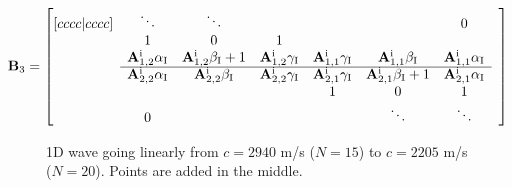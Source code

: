 \documentclass[dvipsnames]{article}
\begin{document}
\begin{equation}
    \mathbf{B}_3 = \begin{bmatrix}[cccc|cccc]
     & \ddots  &\ddots & & & & 0 & \\
       & 1 & 0 & 1 & & & & \\
      & \mathbf{A}_{1, 2}^\text{i}\alpha_\text{I} &\mathbf{A}_{1, 2}^\text{i}\beta_\text{I} + 1 &\mathbf{A}_{1, 2}^\text{i}\gamma_\text{I} & \mathbf{A}_{1, 1}^\text{i}\gamma_\text{I} & \mathbf{A}_{1, 1}^\text{i}\beta_\text{I}& \mathbf{A}_{1, 1}^\text{i}\alpha_\text{I}\\ \cline{2-7}
      &\mathbf{A}_{2, 2}^\text{i}\alpha_\text{I} &\mathbf{A}_{2, 2}^\text{i}\beta_\text{I}&\mathbf{A}_{2, 2}^\text{i}\gamma_\text{I} & \mathbf{A}^\text{i}_{2,1}\gamma_\text{I} & \mathbf{A}^\text{i}_{2,1}\beta_\text{I}+ 1 &\mathbf{A}_{2, 1}^\text{i}\alpha_\text{I} & \\
         & & & &1 & 0 & 1  \\
         & 0 & &  &  &\ddots & \ddots &
    \end{bmatrix}
\end{equation}
\begin{figure}[h]
    \centering
    \hspace{0.05\textwidth}
    \caption{1D wave going linearly from $c = 2940$ m/s ($N=15$) to $c =2205$ m/s ($N=20$). Points are added in the middle.}\label{fig:cubAddInCenter}
\end{figure}
\end{document}
